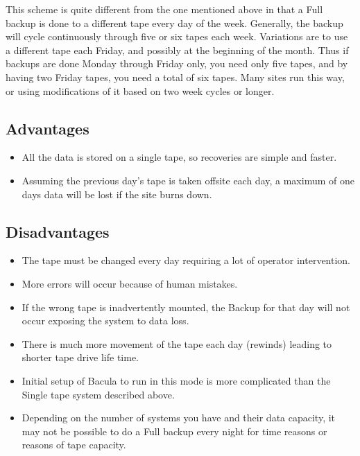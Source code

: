 This scheme is quite different from the one mentioned above in that a Full
backup is done to a different tape every day of the week. Generally, the
backup will cycle continuously through five or six tapes each week. Variations are
to use a different tape each Friday, and possibly at the beginning of the
month. Thus if backups are done Monday through Friday only, you need only five
tapes, and by having two Friday tapes, you need a total of six tapes. Many sites
run this way, or using modifications of it based on two week cycles or longer.


\subsection{Advantages}

\begin{itemize}
\item All the data is stored on a single tape, so recoveries  are simple and
   faster.  
\item Assuming the previous day's tape is taken offsite each  day, a maximum
   of one days data will be lost if the  site burns down. 
   \end{itemize}

\subsection{Disadvantages}

\begin{itemize}
\item The tape must be changed every day requiring a lot of  operator
   intervention.  
\item More errors will occur because of human mistakes.  
\item If the wrong tape is inadvertently mounted, the Backup for  that day
   will not occur exposing the system to data loss.  
\item There is much more movement of the tape each day (rewinds)  leading to
   shorter tape drive life time.  
\item Initial setup of Bacula to run in this mode is more complicated  than
   the Single tape system described above.  
\item Depending on the number of systems you have and their data  capacity, it
   may not be possible to do a Full backup every  night for time reasons or
   reasons of tape capacity. 
\end{itemize}

